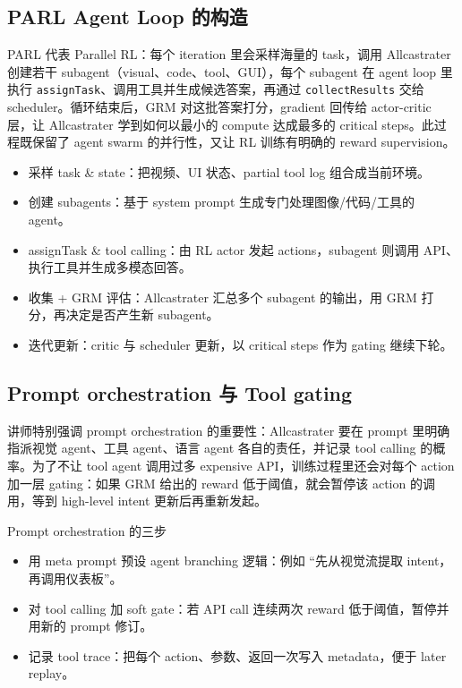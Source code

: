\subsection{PARL Agent Loop 的构造}
PARL 代表 Parallel RL：每个 iteration 里会采样海量的 task，调用 Allcastrater 创建若干 subagent（visual、code、tool、GUI），每个 subagent 在 agent loop 里执行 \texttt{assignTask}、调用工具并生成候选答案，再通过 \texttt{collectResults} 交给 scheduler。循环结束后，GRM 对这批答案打分，gradient 回传给 actor-critic 层，让 Allcastrater 学到如何以最小的 compute 达成最多的 critical steps。此过程既保留了 agent swarm 的并行性，又让 RL 训练有明确的 reward supervision。
\begin{itemize}
    \item 采样 task \& state：把视频、UI 状态、partial tool log 组合成当前环境。
    \item 创建 subagents：基于 system prompt 生成专门处理图像/代码/工具的 agent。
    \item assignTask \& tool calling：由 RL actor 发起 actions，subagent 则调用 API、执行工具并生成多模态回答。
    \item 收集 + GRM 评估：Allcastrater 汇总多个 subagent 的输出，用 GRM 打分，再决定是否产生新 subagent。
    \item 迭代更新：critic 与 scheduler 更新，以 critical steps 作为 gating 继续下轮。
\end{itemize}

\subsection{Prompt orchestration 与 Tool gating}
讲师特别强调 prompt orchestration 的重要性：Allcastrater 要在 prompt 里明确指派视觉 agent、工具 agent、语言 agent 各自的责任，并记录 tool calling 的概率。为了不让 tool agent 调用过多 expensive API，训练过程里还会对每个 action 加一层 gating：如果 GRM 给出的 reward 低于阈值，就会暂停该 action 的调用，等到 high-level intent 更新后再重新发起。

\begin{knowledgebox}{Prompt orchestration 的三步}
\begin{itemize}
    \item 用 meta prompt 预设 agent branching 逻辑：例如 ``先从视觉流提取 intent，再调用仪表板''。
    \item 对 tool calling 加 soft gate：若 API call 连续两次 reward 低于阈值，暂停并用新的 prompt 修订。
    \item 记录 tool trace：把每个 action、参数、返回一次写入 metadata，便于 later replay。
\end{itemize}
\end{knowledgebox}


